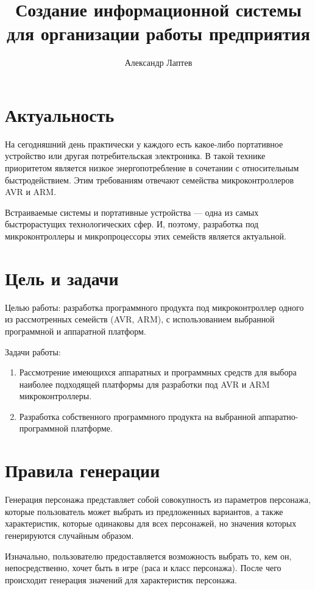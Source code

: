 \documentclass[12pt,a4paper]{article}
\author{Александр Лаптев}
\title{Создание информационной системы для организации работы предприятия}
\begin{document}
\section{Актуальность}

На сегодняшний день практически у каждого есть какое-либо портативное устройство или другая потребительская электроника. В такой технике приоритетом является низкое энергопотребление в сочетании с относительным быстродействием. Этим требованиям отвечают семейства микроконтроллеров AVR и ARM.

Встраиваемые системы и портативные устройства --- одна из самых быстрорастущих технологических сфер. И, поэтому, разработка под микроконтроллеры и микропроцессоры этих семейств является актуальной.

\section{Цель и задачи}

Целью работы: разработка программного продукта под микроконтроллер одного из рассмотренных семейств (AVR, ARM), с использованием выбранной программной и аппаратной платформ.
    
Задачи работы:

\begin{enumerate}
    \item Рассмотрение имеющихся аппаратных и программных средств для выбора наиболее подходящей платформы для разработки под AVR и ARM микроконтроллеры.
    
    \item Разработка собственного программного продукта на выбранной аппаратно-программной платформе.
\end{enumerate}

\section{Правила генерации}

Генерация персонажа представляет собой совокупность из параметров персонажа, которые пользователь может выбрать из предложенных вариантов, а также характеристик, которые одинаковы для всех персонажей, но значения которых генерируются случайным образом.

Изначально, пользователю предоставляется возможность выбрать то, кем он, непосредственно, хочет быть в игре (раса и класс персонажа). После чего происходит генерация значений для характеристик персонажа.
\end{document}
